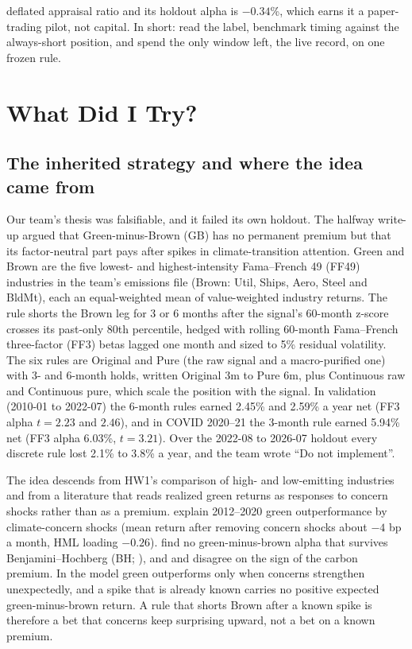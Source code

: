 deflated appraisal ratio and its holdout alpha is $-0.34$\%, which earns it a paper-trading pilot, not capital. In short: read the label, benchmark timing against the always-short position, and spend the only window left, the live record, on one frozen rule.

\clearpage
\section{What Did I Try?}
\label{sec:try}

\subsection{The inherited strategy and where the idea came from}
\label{sec:idea}

Our team's thesis was falsifiable, and it failed its own holdout. The halfway write-up argued that Green-minus-Brown (GB) has no permanent premium but that its factor-neutral part pays after spikes in climate-transition attention. Green and Brown are the five lowest- and highest-intensity Fama--French 49 (FF49) industries in the team's emissions file (Brown: Util, Ships, Aero, Steel and BldMt), each an equal-weighted mean of value-weighted industry returns. The rule shorts the Brown leg for 3 or 6 months after the signal's 60-month z-score crosses its past-only 80th percentile, hedged with rolling 60-month Fama--French three-factor (FF3) betas lagged one month and sized to 5\% residual volatility. The six rules are Original and Pure (the raw signal and a macro-purified one) with 3- and 6-month holds, written Original 3m to Pure 6m, plus Continuous raw and Continuous pure, which scale the position with the signal. In validation (2010-01 to 2022-07) the 6-month rules earned 2.45\% and 2.59\% a year net (FF3 alpha $t=2.23$ and $2.46$), and in COVID 2020--21 the 3-month rule earned 5.94\% net (FF3 alpha 6.03\%, $t=3.21$). Over the 2022-08 to 2026-07 holdout every discrete rule lost 2.1\% to 3.8\% a year, and the team wrote ``Do not implement''.

The idea descends from HW1's comparison of high- and low-emitting industries and from a literature that reads realized green returns as responses to concern shocks rather than as a premium. \citet{pst2022} explain 2012--2020 green outperformance by climate-concern shocks (mean return after removing concern shocks about $-4$ bp a month, HML loading $-0.26$). \citet{eijp2026} find no green-minus-brown alpha that survives Benjamini--Hochberg (BH; \citealp{bh1995}), and \citet{bk2021} and \citet{zhang2025} disagree on the sign of the carbon premium. In the \citet{pst2021} model green outperforms only when concerns strengthen unexpectedly, and a spike that is already known carries no positive expected green-minus-brown return. A rule that shorts Brown after a known spike is therefore a bet that concerns keep surprising upward, not a bet on a known premium.

